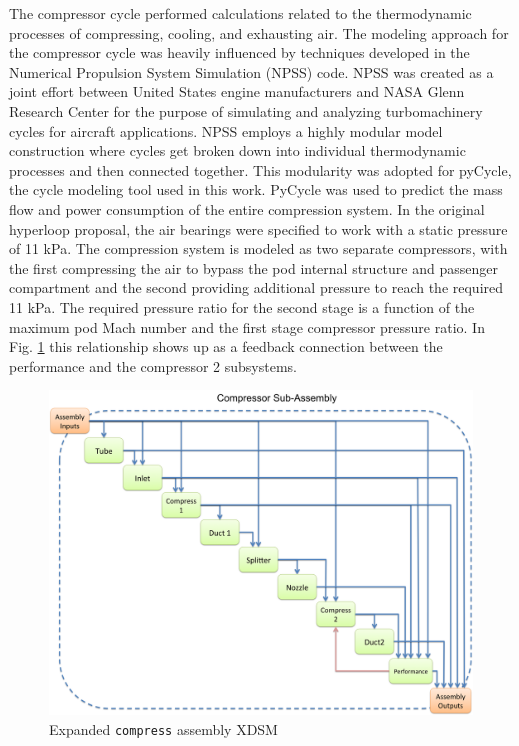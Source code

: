 \documentclass[heading.tex]{subfiles}
\begin{document}
The compressor cycle performed calculations related to the thermodynamic processes of compressing, cooling, and exhausting air. 
The modeling approach for the compressor cycle was heavily influenced by techniques developed in the Numerical Propulsion System Simulation (NPSS) code. 
NPSS was created as a joint effort between United States engine manufacturers and NASA Glenn Research Center for the purpose of 
simulating and analyzing turbomachinery cycles for aircraft applications\cite{Lytle}. NPSS employs a highly modular model construction
where cycles get broken down into individual thermodynamic processes and then connected together. This modularity was adopted for pyCycle, 
the cycle modeling tool used in this work. PyCycle was used to predict the mass flow and power consumption of the entire compression system. 
In the original hyperloop proposal, the air bearings were specified to work with a static pressure of 11 kPa. The compression system is modeled as two separate compressors, with the first compressing the air to bypass the pod internal structure and passenger compartment and the second providing additional pressure to reach the required 11 kPa. The required pressure ratio for the second stage
is a function of the maximum pod Mach number and the first stage compressor pressure ratio. In Fig. \ref{f:compressorXDSM} this relationship 
shows up as a feedback connection between the performance and the compressor 2 subsystems. 

\begin{figure}[H]
\centering
\includegraphics[width=\textwidth]{images/compAssembly.png}
\caption{Expanded \texttt{compress} assembly XDSM}
\label{f:compressorXDSM}
\end{figure}
\end{document}
